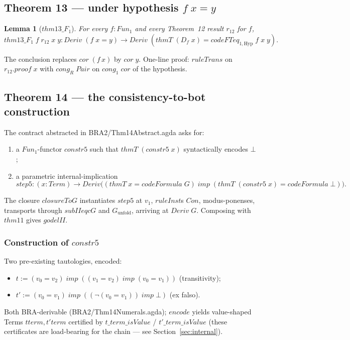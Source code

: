 \documentclass[11pt]{article}
\newtheorem{lemma}[theorem]{Lemma}
\begin{document}
\subsection{Theorem 13 --- under hypothesis $f\;x = y$}
\label{subsec:thm13}

\begin{lemma}[$\mathit{thm13}\_F_1$]
For every $f : \mathit{Fun}_1$ and every Theorem~12 result $r_{12}$ for $f$,
\(
  \mathit{thm13}\_F_1\;f\;r_{12}\;x\;y : \mathit{Deriv}\;(f\;x = y) \to
    \mathit{Deriv}\;(\mathit{thmT}\;(D_f\;x) = \mathit{codeFTeq}_{1,\mathrm{Hyp}}\;f\;x\;y).
\)
\end{lemma}
The conclusion replaces $\mathit{cor}\;(f\,x)$ by $\mathit{cor}\;y$.
One-line proof: $\mathit{ruleTrans}$ on $r_{12}.\mathit{proof}\;x$ with
$\mathit{cong}_R\;\mathit{Pair}$ on $\mathit{cong}_1\;\mathit{cor}$ of
the hypothesis.

\subsection{Theorem 14 --- the consistency-to-bot construction}

The contract abstracted in BRA2/Thm14Abstract.agda asks for:
\begin{enumerate}
  \item a $\mathit{Fun}_1$-functor $\mathit{constr5}$ such that
        $\mathit{thmT}\;(\mathit{constr5}\;x)$ syntactically encodes
        $\bot$;
  \item a parametric internal-implication
\[
  \mathit{step5} : (x : \mathit{Term}) \to
   \mathit{Deriv}\bigl((\mathit{thmT}\;x = \mathit{codeFormula}\;G)
                  \;\mathit{imp}\;
                  (\mathit{thmT}\;(\mathit{constr5}\;x) = \mathit{codeFormula}\;\bot)\bigr).
\]
\end{enumerate}

The closure $\mathit{closureToG}$ instantiates $\mathit{step5}$ at $v_1$,
$\mathit{ruleInst}$s $\mathit{Con}$, modus-ponenses, transports through
$\mathit{subIIeqcG}$ and $G_{\mathrm{unfold}}$, arriving at
$\mathit{Deriv}\;G$.  Composing with $\mathit{thm11}$ gives $\mathit{godelII}$.

\subsubsection{Construction of $\mathit{constr5}$}

Two pre-existing tautologies, encoded:
\begin{itemize}
  \item $t := (v_0 = v_2)\;\mathit{imp}\;((v_1 = v_2)\;\mathit{imp}\;(v_0 = v_1))$ (transitivity);
  \item $t' := (v_0 = v_1)\;\mathit{imp}\;((\neg(v_0 = v_1))\;\mathit{imp}\;\bot)$ (ex falso).
\end{itemize}
Both BRA-derivable (BRA2/Thm14Numerals.agda); $\mathit{encode}$ yields
value-shaped Terms $\mathit{tterm}, \mathit{t'term}$ certified by
$t\_term\_isValue$ / $t'\_term\_isValue$ (these certificates are
load-bearing for the chain --- see Section~\ref{sec:internal}).
\end{document}
